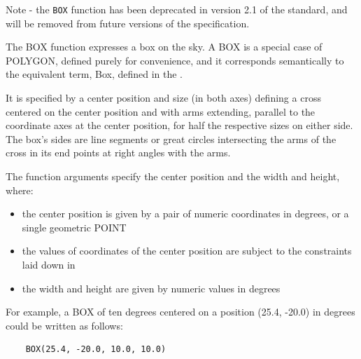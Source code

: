 \documentclass[11pt,a4paper]{ivoa}
\begin{document}
Note - the \verb|BOX| function has been deprecated in version 2.1 of the standard,
and will be removed from future versions of the specification.

The BOX function expresses a box on the sky. A BOX is a special case of POLYGON,
defined purely for convenience,
and it corresponds semantically to the equivalent term, Box, defined in
the \STCSpec{}.

It is specified by a center position and size
(in both axes) defining a cross centered on the center position and
with arms extending, parallel to the coordinate axes at the center position,
for half the respective sizes on either side. The box’s sides are line
segments or great circles intersecting the arms of the cross in its end
points at right angles with the arms.



The function arguments specify the center position and the width and height,
where:
\begin{itemize}
    \item the center position is given by a pair of numeric coordinates
          in degrees, or a single geometric POINT
    \item the values of coordinates of the center position are subject to the
          constraints laid down in 
    \item the width and height are given by numeric values in degrees
\end{itemize}

For example, a BOX of ten degrees centered on a position
(25.4, -20.0) in degrees could be written as follows:
\begin{verbatim}
    BOX(25.4, -20.0, 10.0, 10.0)
\end{verbatim}
\end{document}
